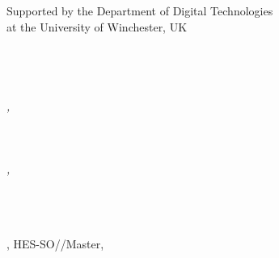 \begin{titlepage}
{\begin{flushright}
		{
		\LARGE \Orientation\\[1.5cm]
		}
		{
			\Huge
			\textbf{\ThesisTitle} \\[0.5cm]
		}
		{
			\LARGE
			Supported by the Department of Digital Technologies \\
			at the University of Winchester, UK \\[1.5cm]
		}
		{
			\large
			\\[-0.3cm]
			\Huge \Author \\[1.5cm]
		}
		{
			\large
			 \\
			\SupervisorOne \\
			\textit{\SupervisorOneSchool, \\ \SupervisorOneResearchUnit} \\
			 \\
			\SupervisorTwo \\
			\textit{\SupervisorTwoSchool, \\ \SupervisorTwoResearchUnit} \\[0.5cm]
		}
		{
			\large
			 \\
			\Expert \\
			\textit{\ExpertLab}
		}
		
		\vfill
		
		{\large \Place, HES-SO//Master, \Date}
		
	\end{flushright}
}
\restoregeometry
\end{titlepage}